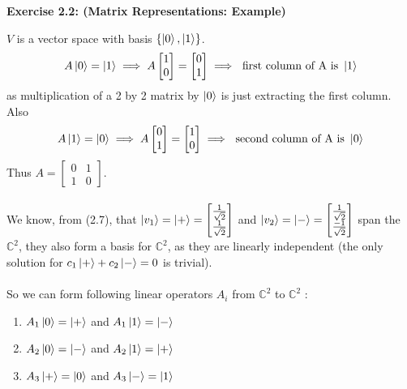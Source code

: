 \documentclass{article}
\begin{document}
\begin{framed}
    \noindent \textbf{Exercise 2.2: (Matrix Representations: Example)}

    \medskip
    $V$ is a vector space with basis $\{ \ket{0}, \ket{1} \}$. \\
    $$
        A\ket{0} = \ket{1} \implies A\begin{bmatrix} 1 \\ 0 \end{bmatrix} = \begin{bmatrix} 0 \\ 1 \end{bmatrix} \implies \text{ first column of A is } 
        \ket{1}
    $$
    as multiplication of a 2 by 2 matrix by  $\ket{0}$ is just extracting the first column. Also
    $$
        A\ket{1} = \ket{0} \implies A\begin{bmatrix} 0 \\ 1 \end{bmatrix} = \begin{bmatrix} 1 \\ 0 \end{bmatrix} \implies \text{ second column of A is } \ket{0}
    $$
    Thus $A = \begin{bmatrix} 0 & 1 \\ 1 & 0 \end{bmatrix}$. \\ \\ 
    We know, from (2.7), that $\ket{v_1} = \ket{+} = \begin{bmatrix} \frac{1}{\sqrt{2}} \\ \frac{1}{\sqrt{2}} \end{bmatrix}$ and $\ket{v_2} = \ket{-} = \begin{bmatrix} \frac{1}{\sqrt{2}} \\ \frac{-1}{\sqrt{2}} \end{bmatrix}$ span the $\mathbb{C}^{2}$, they also form a basis for $\mathbb{C}^2$, as they are linearly independent (the only solution for $c_1\ket{+} + c_2\ket{-} = 0$ is trivial). \\ \\ 
    So we can form following linear operators $A_i$ from $\mathbb{C}^{2}$ to $\mathbb{C}^{2}$ :
    \begin{enumerate}
        \item $A_1\ket{0} = \ket{+}$ and $A_1\ket{1} = \ket{-}$
        \item $A_2\ket{0} = \ket{-}$ and $A_2\ket{1} = \ket{+}$
        \item $A_3\ket{+} = \ket{0}$ and $A_3\ket{-} = \ket{1}$

\end{enumerate}
\end{framed}
\end{document}
